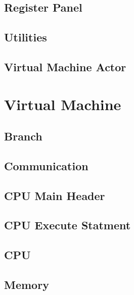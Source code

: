 \documentclass[a4paper,11pt]{report}
\begin{document}
\begin{appendices}
\subsection{Register Panel}\label{source:register_panel}

\subsection{Utilities}\label{source:utilities}

\subsection{Virtual Machine Actor}\label{source:vm_actor}

\section{Virtual Machine}
\subsection{Branch}\label{source:vm_branch}

\subsection{Communication}\label{source:vm_comm}

\subsection{CPU Main Header}\label{source:vm_cpu_header}

\subsection{CPU Execute Statment}\label{source:vm_cpu_execute}

\subsection{CPU}\label{source:vm_cpu}

\subsection{Memory}\label{source:vm_memory}


\end{appendices}
\end{document}
